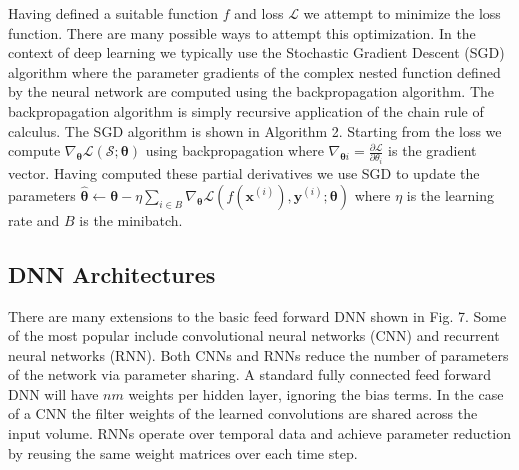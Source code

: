 \documentclass[11pt]{article}
\begin{document}
Having defined a suitable function $f$ and loss $\mathcal{L}$ we attempt to minimize the loss function.  There are many possible ways to attempt this optimization.  In the context of deep learning we typically use the Stochastic Gradient Descent (SGD) algorithm where the parameter gradients of the complex nested function defined by the neural network are computed using the backpropagation algorithm.  The backpropagation algorithm is simply recursive application of the chain rule of calculus.  The SGD algorithm is shown in Algorithm 2.  Starting from the loss we compute $\nabla_{\boldsymbol{\theta}} \mathcal{L}(\mathcal{S} ;\boldsymbol{\theta})$ using backpropagation where $\nabla_{\boldsymbol{\theta}i} = \frac{\partial \mathcal{L}}{\partial \theta_i }$ is the gradient vector.  Having computed these partial derivatives we use SGD to update the parameters $\boldsymbol{\hat{\theta}} \leftarrow \boldsymbol{\theta} - \eta \sum_{i \in B} \nabla_{\boldsymbol{\theta}} \mathcal{L}(f(\textbf{x}^{(i)}), \textbf{y}^{(i)} ;\boldsymbol{\theta})$ where $\eta$ is the learning rate and $B$ is the minibatch.

\subsection{DNN Architectures}
There are many extensions to the basic feed forward DNN shown in Fig. 7.  Some of the most popular include convolutional neural networks (CNN) and recurrent neural networks (RNN).  Both CNNs and RNNs reduce the number of parameters of the network via parameter sharing.  A standard fully connected feed forward DNN will have $nm$ weights per hidden layer, ignoring the bias terms.  In the case of a CNN the filter weights of the learned convolutions are shared across the input volume.  RNNs operate over temporal data and achieve parameter reduction by reusing the same weight matrices over each time step.  
\end{document}

